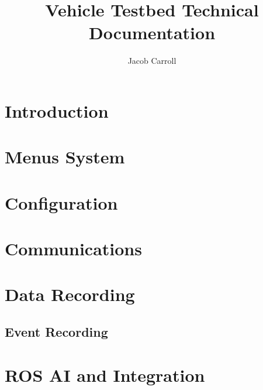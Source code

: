 \documentclass{article}
\title{Vehicle Testbed Technical Documentation}
\author{Jacob Carroll}
\date{ }
\begin{document}
 
\maketitle
 
\section{Introduction}


\section{Menus System}

 
\section{Configuration}

 
\section{Communications}


\section{Data Recording}
\subsection{Event Recording}


\section{ROS AI and Integration}

\end{document}
